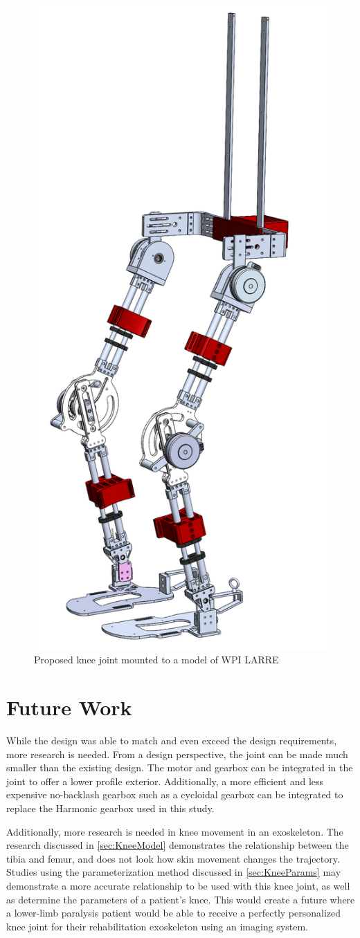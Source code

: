 \begin{figure}[ht!]
    \centering
    \includegraphics[width=0.4\linewidth]{Figures/FinalExoRender.png}
    \caption{Proposed knee joint mounted to a model of WPI LARRE}
    \label{fig:KneeOnExo}
\end{figure}


\section{Future Work}

While the design was able to match and even exceed the design requirements, more research is needed. From a design perspective, the joint can be made much smaller than the existing design. The motor and gearbox can be integrated in the joint to offer a lower profile exterior. Additionally, a more efficient and less expensive no-backlash gearbox such as a cycloidal gearbox can be integrated to replace the {Harmonic\texttrademark} gearbox used in this study. 

Additionally, more research is needed in knee movement in an exoskeleton. The research discussed in \autoref{sec:KneeModel} demonstrates the relationship between the tibia and femur, and does not look how skin movement changes the trajectory. Studies using the parameterization method discussed in \autoref{sec:KneeParams} may demonstrate a more accurate relationship to be used with this knee joint, as well as determine the parameters of a patient's knee. This would create a future where a lower-limb paralysis patient would be able to receive a perfectly personalized knee joint for their rehabilitation exoskeleton using an imaging system.